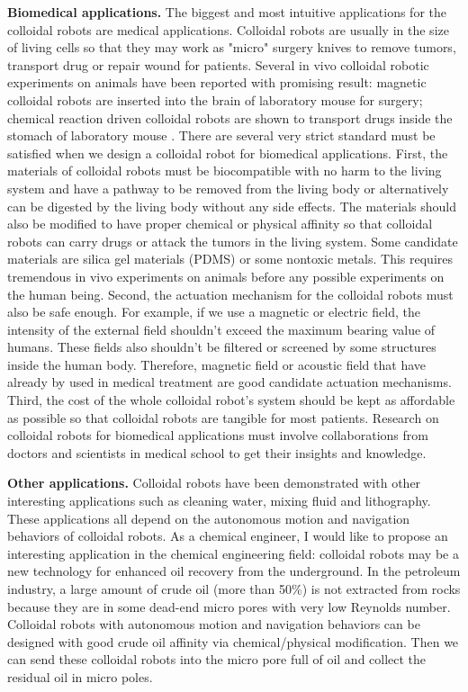 \textbf{Biomedical applications.} The biggest and most intuitive applications for the colloidal robots are medical applications. Colloidal robots are usually in the size of living cells so that they may work as "micro" surgery knives to remove tumors, transport drug or repair wound for patients. Several in vivo colloidal robotic experiments  on animals have been reported with promising result: magnetic colloidal robots are inserted into the brain of laboratory mouse for surgery\autocite{li2018development}; chemical reaction driven colloidal robots are shown to transport drugs inside the stomach of laboratory mouse \autocite{Gao2015}.
There are several very strict standard must be satisfied when we design a colloidal robot for biomedical applications. First, the materials of colloidal robots must be biocompatible with no harm to the living system and have a pathway to be removed from the living body or alternatively can be digested by the living body without any side effects. The materials should also be modified to have proper chemical or physical affinity so that colloidal robots can carry drugs or attack the tumors in the living system. Some candidate materials are silica gel materials (PDMS) or some nontoxic metals. This requires tremendous in vivo experiments on animals before  any possible experiments on the human being. Second, the actuation mechanism for the colloidal robots must also be safe enough. For example, if we use a magnetic or electric field, the intensity of the external field shouldn't exceed the maximum bearing value of humans. These fields also shouldn't be  filtered or screened by some structures inside the human body. Therefore, magnetic field or acoustic field that have already by used in medical treatment are good  candidate actuation mechanisms.  Third, the cost of the whole colloidal robot's system should be kept as affordable as possible so that colloidal robots are tangible for most patients. Research on colloidal robots for biomedical applications must involve collaborations from doctors and scientists in medical school to get their insights and knowledge.

\textbf{Other applications.} Colloidal robots have been demonstrated with other interesting applications such as cleaning water, mixing fluid and lithography\autocite{soler2014catalytic,fei2019magneto,li2014nanomotor}. These applications all depend on the autonomous motion and navigation behaviors of colloidal robots. As a chemical engineer, I would like to propose an interesting application in the chemical engineering field: colloidal robots may be a new technology for enhanced oil recovery from the underground. In the petroleum industry, a large amount of crude oil (more than 50$\%$) is not extracted from rocks because they are in some dead-end micro pores with very low Reynolds number. Colloidal robots with autonomous motion and navigation behaviors can be designed with good crude oil affinity via chemical/physical modification. Then we can send these colloidal robots into the micro pore full of oil and collect the residual oil in micro poles.

